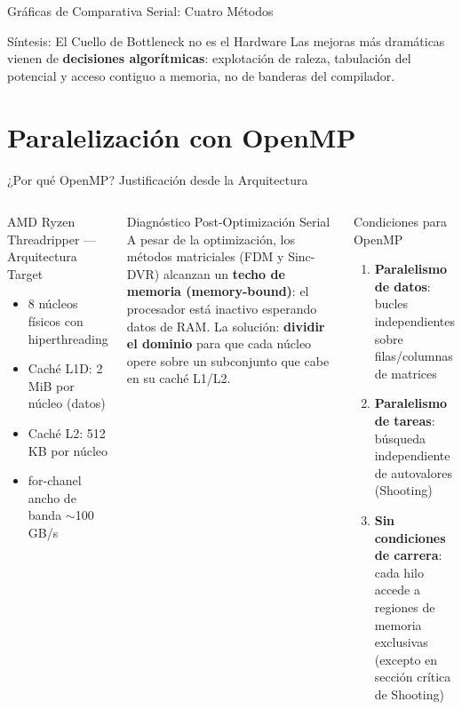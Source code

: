 \documentclass[aspectratio=169,10pt]{beamer}
\begin{document}
\begin{frame}{Gráficas de Comparativa Serial: Cuatro Métodos}
\vspace{0.135cm}
\begin{conclusionbox}{Síntesis: El Cuello de Bottleneck no es el Hardware}
Las mejoras más dramáticas vienen de \textbf{decisiones algorítmicas}: explotación de raleza, tabulación del potencial y acceso contiguo a memoria, no de banderas del compilador.
\end{conclusionbox}
\end{frame}

\section{Paralelización con OpenMP}

\begin{frame}[allowframebreaks]{¿Por qué OpenMP? Justificación desde la Arquitectura}
\begin{columns}[T]
\begin{physbox}{AMD Ryzen Threadripper — Arquitectura Target}
\begin{itemize}\setlength\itemsep{3pt}
  \item 8 núcleos físicos con hiperthreading
  \item Caché L1D: 2 MiB por núcleo (datos)
  \item Caché L2: 512 KB por núcleo

  \item for-chanel  ancho de banda $\sim$100 GB/s
\end{itemize}
\end{physbox}
\vspace{-0.18cm}
\begin{block}{Diagnóstico Post-Optimización Serial}
A pesar de la optimización, los métodos matriciales (FDM y Sinc-DVR) alcanzan un \textbf{techo de memoria (memory-bound)}: el procesador está inactivo esperando datos de RAM. La solución: \textbf{dividir el dominio} para que cada núcleo opere sobre un subconjunto que cabe en su caché L1/L2.
\end{block}

\begin{successbox}{Condiciones para OpenMP}
\begin{enumerate}\setlength\itemsep{4pt}
  \item \textbf{Paralelismo de datos}: bucles independientes sobre filas/columnas de matrices
  \item \textbf{Paralelismo de tareas}: búsqueda independiente de autovalores (Shooting)
  \item \textbf{Sin condiciones de carrera}: cada hilo accede a regiones de memoria exclusivas (excepto en sección crítica de Shooting)
\end{enumerate}
\end{successbox}
\vspace{0.18cm}

\end{columns}
\end{frame}
\end{document}
